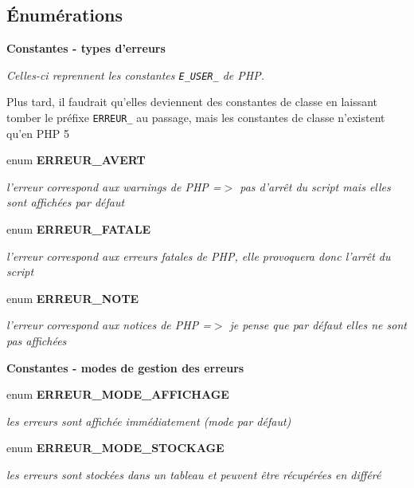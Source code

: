 \subsection*{Énumérations}
\begin{Indent}{\bf Constantes - types d'erreurs}\par
{\em Celles-ci reprennent les constantes {\tt E\_\-USER\_\-} de PHP.

Plus tard, il faudrait qu'elles deviennent des constantes de classe en laissant tomber le préfixe {\tt ERREUR\_\-} au passage, mais les constantes de classe n'existent qu'en PHP 5 }\begin{CompactItemize}
\item 
enum {\bf ERREUR\_\-AVERT} 
\begin{CompactList}\small\item\em l'erreur correspond aux warnings de PHP =$>$ pas d'arrêt du script mais elles sont affichées par défaut \item\end{CompactList}\item 
enum {\bf ERREUR\_\-FATALE} 
\begin{CompactList}\small\item\em l'erreur correspond aux erreurs fatales de PHP, elle provoquera donc l'arrêt du script \item\end{CompactList}\item 
enum {\bf ERREUR\_\-NOTE} 
\begin{CompactList}\small\item\em l'erreur correspond aux notices de PHP =$>$ je pense que par défaut elles ne sont pas affichées \item\end{CompactList}\end{CompactItemize}
\end{Indent}
\begin{Indent}{\bf Constantes - modes de gestion des erreurs}\par
\begin{CompactItemize}
\item 
enum {\bf ERREUR\_\-MODE\_\-AFFICHAGE} 
\begin{CompactList}\small\item\em les erreurs sont affichée immédiatement (mode par défaut) \item\end{CompactList}\item 
enum {\bf ERREUR\_\-MODE\_\-STOCKAGE} 
\begin{CompactList}\small\item\em les erreurs sont stockées dans un tableau et peuvent être récupérées en différé \item\end{CompactList}\end{CompactItemize}
\end{Indent}
